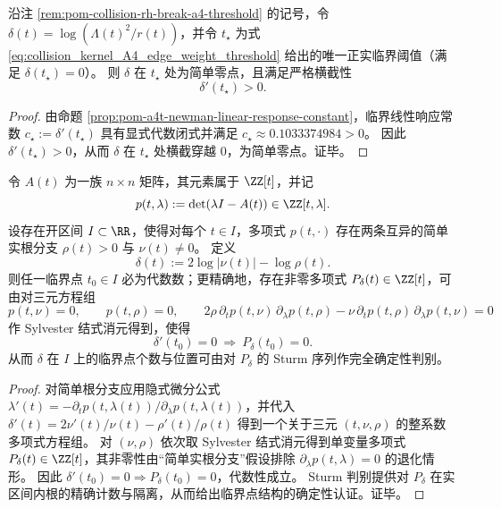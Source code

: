 \begin{corollary}\label{cor:pom-a4t-newman-transversality}
沿注 \ref{rem:pom-collision-rh-break-a4-threshold} 的记号，令
\(
\delta(t)=\log(\Lambda(t)^2/r(t))
\)，并令 \(t_\star\) 为式 \eqref{eq:collision_kernel_A4_edge_weight_threshold} 给出的唯一正实临界阈值（满足 \(\delta(t_\star)=0\)）。
则 \(\delta\) 在 \(t_\star\) 处为简单零点，且满足严格横截性
\[
\delta'(t_\star)>0.
\]
\end{corollary}
\begin{proof}
由命题 \ref{prop:pom-a4t-newman-linear-response-constant}，临界线性响应常数 \(c_\star:=\delta'(t_\star)\) 具有显式代数闭式并满足 \(c_\star\approx 0.1033374984>0\)。
因此 \(\delta'(t_\star)>0\)，从而 \(\delta\) 在 \(t_\star\) 处横截穿越 \(0\)，为简单零点。证毕。
\end{proof}

\begin{theorem}\label{thm:pom-newman-critical-algebraic-elimination-sturm}
令 \(A(t)\) 为一族 \(n\times n\) 矩阵，其元素属于 \(\ZZ[t]\)，并记
\[
p(t,\lambda):=\det(\lambda I-A(t))\in\ZZ[t,\lambda].
\]
设存在开区间 \(I\subset\RR\)，使得对每个 \(t\in I\)，多项式 \(p(t,\cdot)\) 存在两条互异的简单实根分支 \(\rho(t)>0\) 与 \(\nu(t)\neq 0\)。
定义
\[
\delta(t):=2\log|\nu(t)|-\log\rho(t).
\]
则任一临界点 \(t_0\in I\) 必为代数数；更精确地，存在非零多项式 \(P_\delta(t)\in\ZZ[t]\)，可由对三元方程组
\[
p(t,\nu)=0,\qquad p(t,\rho)=0,\qquad
2\rho\,\partial_t p(t,\nu)\,\partial_\lambda p(t,\rho)-\nu\,\partial_t p(t,\rho)\,\partial_\lambda p(t,\nu)=0
\]
作 Sylvester 结式消元得到，使得
\[
\delta'(t_0)=0\ \Longrightarrow\ P_\delta(t_0)=0.
\]
从而 \(\delta\) 在 \(I\) 上的临界点个数与位置可由对 \(P_\delta\) 的 Sturm 序列作完全确定性判别。
\end{theorem}
\begin{proof}
对简单根分支应用隐式微分公式
\(
\lambda'(t)=-\partial_t p(t,\lambda(t))/\partial_\lambda p(t,\lambda(t))
\)，并代入 \(\delta'(t)=2\nu'(t)/\nu(t)-\rho'(t)/\rho(t)\) 得到一个关于三元 \((t,\nu,\rho)\) 的整系数多项式方程组。
对 \((\nu,\rho)\) 依次取 Sylvester 结式消元得到单变量多项式 \(P_\delta(t)\in\ZZ[t]\)，其非零性由“简单实根分支”假设排除 \(\partial_\lambda p(t,\lambda)=0\) 的退化情形。
因此 \(\delta'(t_0)=0\Rightarrow P_\delta(t_0)=0\)，代数性成立。
Sturm 判别提供对 \(P_\delta\) 在实区间内根的精确计数与隔离，从而给出临界点结构的确定性认证。证毕。
\end{proof}

\endinput
